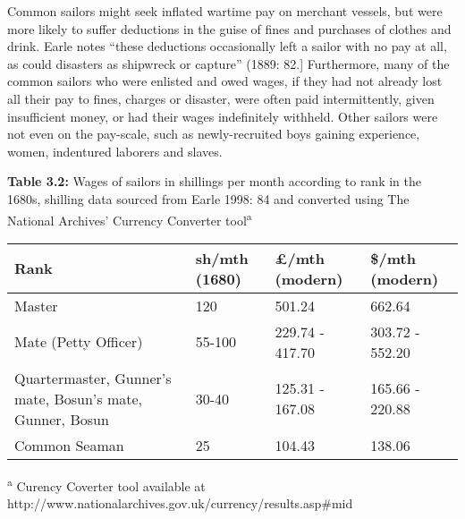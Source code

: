 \begin{styleStandard}
Common sailors might seek inflated wartime pay on merchant vessels, but were more likely to suffer deductions in the guise of fines and purchases of clothes and drink. Earle notes “these deductions occasionally left a sailor with no pay at all, as could disasters as shipwreck or capture” (1889: 82.] Furthermore, many of the common sailors who were enlisted and owed wages, if they had not already lost all their pay to fines, charges or disaster, were often paid intermittently, given insufficient money, or had their wages indefinitely withheld. Other sailors were not even on the pay-scale, such as newly-recruited boys gaining experience, women, indentured laborers and slaves. 
\end{styleStandard}

\begin{styleStandard}
\textbf{Table 3.2: }Wages of sailors in shillings per month according to rank in the 1680s, shilling data sourced from Earle 1998: 84 and converted using The National Archives’ Currency Converter tool\textsuperscript{a}
\end{styleStandard}

\begin{flushleft}
\tablefirsthead{}
\tablehead{}
\tabletail{}
\tablelasttail{}
\begin{supertabular}{m{2.05666in}m{1.0670599in}m{1.3170599in}m{1.2018598in}}
\hline
\textbf{Rank} &
\textbf{sh/mth (1680)} &
\textbf{£/mth (modern)} &
\textbf{\$/mth (modern)}\\\hline
Master &
120 &
501.24 &
662.64\\
Mate (Petty Officer) &
55-100 &
229.74 - 417.70 &
303.72 - 552.20\\
Quartermaster, Gunner’s mate, Bosun’s mate, Gunner, Bosun &
30-40 &
125.31 - 167.08 &
165.66 - 220.88\\
Common Seaman &
25 &
104.43 &
138.06\\\hline
\end{supertabular}
\end{flushleft}
\begin{styleStandard}
\textsuperscript{a} Curency Coverter tool available at http://www.nationalarchives.gov.uk/currency/results.asp\#mid
\end{styleStandard}

